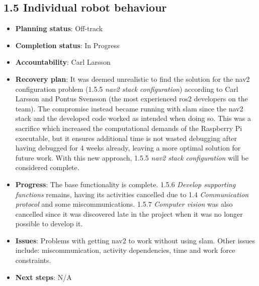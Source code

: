 \subsection*{1.5 Individual robot behaviour}
\begin{itemize}
    \item \textbf{Planning status}: Off-track
    \item \textbf{Completion status}: In Progress
    \item \textbf{Accountability}: Carl Larsson
    \item \textbf{Recovery plan}: It was deemed unrealistic to find the solution for the nav2 configuration problem (1.5.5 \textit{nav2 stack configuration}) according to Carl Larsson and Pontus Svensson (the most experienced \ac{ros2} developers on the team). The compromise instead became running with \ac{slam} since the nav2 stack and the developed code worked as intended when doing so. This was a sacrifice which increased the computational demands of the Raspberry Pi executable, but it ensures additional time is not wasted debugging after having debugged for 4 weeks already, leaving a more optimal solution for future work. With this new approach, 1.5.5 \textit{nav2 stack configuration} will be considered complete.
    \item \textbf{Progress}: The base functionality is complete. 1.5.6 \textit{Develop supporting functions} remains, having its activities cancelled due to 1.4 \textit{Communication protocol} and some miscommunications. 1.5.7 \textit{Computer vision} was also cancelled since it was discovered late in the project when it was no longer possible to develop it.
    \item \textbf{Issues}: Problems with getting nav2 to work without using \ac{slam}. Other issues include: miscommunication, activity dependencies, time and work force constraints.
    \item \textbf{Next steps}: N/A
\end{itemize}


